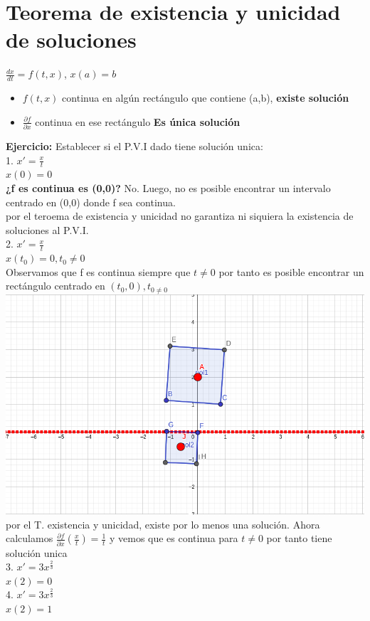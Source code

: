 \documentclass{book}
\begin{document}
    \section{Teorema de existencia y unicidad de soluciones}
    $\frac{dx}{dt} = f(t,x)$, $x(a)=b$
    \begin{itemize}
        \item $f(t,x)$ continua en algún rectángulo que contiene (a,b), \textbf{existe solución}
        \item $\frac{\partial f }{\partial x}$ continua en ese rectángulo \textbf{Es única solución}
    \end{itemize}
    \textbf{Ejercicio:} Establecer si el P.V.I dado tiene solución unica: \\ 
    1. $x'= \frac{x}{t} $ \\ $x(0)=0$ \\ \textbf{¿f es continua es (0,0)?} No. Luego, no es posible encontrar un intervalo centrado en (0,0)
    donde f sea continua. \\ 
    por el teroema de existencia y unicidad no garantiza ni siquiera la existencia de soluciones al P.V.I. \\ 
    2. $x'= \frac{x}{t} $ \\ $x(t_{0})=0, t_{0} \not = 0$ \\ 
    Observamos que f es continua siempre que $t \not = 0$ por tanto es posible encontrar un rectángulo centrado 
    en $(t_{0}, 0), t_{0 \not = 0 }$ \\ 
    \includegraphics[scale=0.4]{imagenes/PVI_01.png}\\ 
    por el T. existencia y unicidad, existe por lo menos una solución. 
    Ahora calculamos $\frac{\partial f }{\partial x}(\frac{x}{t})= \frac{1}{t}$ y vemos que es continua para $t \not = 0$ por tanto tiene solución unica
    \\ 
    3.  $x'= 3x^{\frac{2}{3}} $ \\ $x(2)=0$ \\ 
    4. $x'= 3x^{\frac{2}{3}} $ \\ $x(2)=1$ \\ 
    
\end{document}
